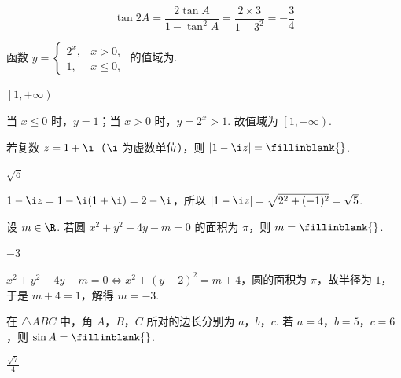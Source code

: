 \begin{solution}
\[
\tan 2A=\frac{2\tan A}{1-\tan^2 A}
=\frac{2\times 3}{1-3^2}
=-\frac34
\]
\end{solution}

\begin{problem}
函数 \(y=\begin{cases}
2^x,&x>0,\\
1,&x\le 0,
\end{cases}\) 的值域为\fillinblank{}.
\end{problem}

\begin{answer}
\(\left[1,+\infty\right)\)
\end{answer}

\begin{solution}
当 \(x\le 0\) 时，\(y=1\)；当 \(x>0\) 时，\(y=2^x>1\). 故值域为 \(\left[1,+\infty\right)\).
\end{solution}

\begin{problem}
若复数 \(z=1+\i\)（\(\i\) 为虚数单位），则 \(\left|1-\i z\right|=\fillinblank{}\).
\end{problem}

\begin{answer}
\(\sqrt5\)
\end{answer}

\begin{solution}
\(1-\i z=1-\i(1+\i)=2-\i\)，所以 \(\left|1-\i z\right|=\sqrt{2^2+(-1)^2}=\sqrt5\).
\end{solution}

\begin{problem}
设 \(m\in\R\). 若圆 \(x^2+y^2-4y-m=0\) 的面积为 \(\pi\)，则 \(m=\fillinblank{}\).
\end{problem}

\begin{answer}
\(-3\)
\end{answer}

\begin{solution}
\(x^2+y^2-4y-m=0\iff x^2+\left(y-2\right)^2=m+4\)，圆的面积为 \(\pi\)，故半径为 \(1\)，于是 \(m+4=1\)，解得 \(m=-3\).
\end{solution}

\begin{problem}
在 \(\triangle ABC\) 中，角 \(A\)，\(B\)，\(C\) 所对的边长分别为 \(a\)，\(b\)，\(c\). 若 \(a=4\)，\(b=5\)，\(c=6\)，则 \(\sin A=\fillinblank{}\).
\end{problem}

\begin{answer}
\(\frac{\sqrt7}{4}\)
\end{answer}

